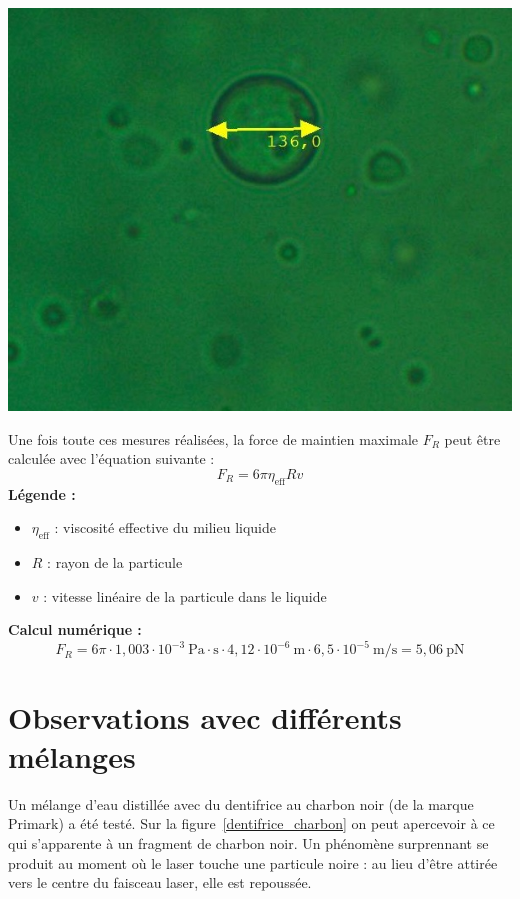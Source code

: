 \begin{minipage}{0.38\textwidth}
    \centering
    \includegraphics[width=\textwidth]{assets/figures/Notice de laboratoire/mesure_bead.jpg}
    \label{mesure_bead}
\end{minipage}
\newpage
Une fois toute ces mesures réalisées, la force de maintien maximale \( F_R \) peut être calculée avec l'équation suivante :
\begin{equation}
    F_R = 6 \pi \eta_{\text{eff}} R v \tag{1}
\end{equation}
\textbf{Légende :}
\begin{itemize}[label=\textbullet]
    \item $\eta_{\text{eff}}$ : viscosité effective du milieu liquide
    \item $R$ : rayon de la particule
    \item $v$ : vitesse linéaire de la particule dans le liquide
\end{itemize}

\textbf{Calcul numérique :}
\[
    F_R = 6 \pi \cdot 1{,}003 \cdot 10^{-3}~\text{Pa}\cdot\text{s} \cdot 4{,}12 \cdot 10^{-6}~\text{m} \cdot 6{,}5 \cdot 10^{-5}~\text{m/s} = 5{,}06~\text{pN}
\]

\section{Observations avec différents mélanges}
Un mélange d'eau distillée avec du dentifrice au charbon noir (de la marque Primark) a été testé. Sur la figure~\ref{dentifrice_charbon} on peut apercevoir à ce qui s'apparente à un fragment de charbon noir. Un phénomène surprennant se produit au moment où le laser touche une particule noire : au lieu d'être attirée vers le centre du faisceau laser, elle est repoussée.

